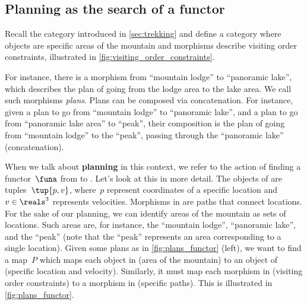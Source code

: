 \subsection{Planning as the search of a functor}

\begin{example}
	\label{ex:planning-as-search-functor}
	Recall the category \Berg introduced in \cref{sec:trekking} and define a category \Plans where objects are specific areas of the mountain and morphisms describe visiting order constraints, illustrated in \cref{fig:visiting_order_constraints}.

	For instance, there is a morphism from ``mountain lodge'' to ``panoramic lake'', which describes the plan of going from the lodge area to the lake area.
	We call such morphisms \emph{plans}.
	Plans can be composed via concatenation.
	For instance, given a plan to go from ``mountain lodge'' to ``panoramic lake'', and a plan to go from ``panoramic lake area'' to ``peak'', their composition is the plan of going from ``mountain lodge'' to the ``peak'', passing through the ``panoramic lake'' (concatenation).

	When we talk about \textbf{planning} in this context, we refer to the action of finding a functor~$\funa$ from \Plans to \Berg.
	Let's look at this in more detail.
	The objects of \Berg are tuples~$\tup{p,v}$, where~$p$ represent coordinates of a specific location and~$v\in \reals^3$ represents velocities.
	Morphisms in \Berg are paths that connect locations.
	For the sake of our planning, we can identify areas of the mountain as sets of locations.
	Such areas are, for instance, the ``mountain lodge'', ``panoramic lake'', and the
	``peak'' (note that the ``peak'' represents an area corresponding to a single location).
	Given some plans as in \cref{fig:plans_functor} (left), we want to find a map~$P$ which maps each object in \Plans (area of the mountain) to an object of \Berg (specific location and velocity).
	Similarly, it must map each morphism in \Plans (visiting order constraints) to a morphism in \Berg (specific paths).
	This is illustrated in \cref{fig:plans_functor}.
\end{example}

\begin{figure*}[h!]
	\centering
	\caption{Planning functor.}
	\label{fig:plans_functor}
\end{figure*}
